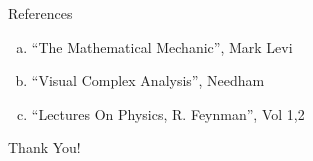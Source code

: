\documentclass[9pt]{beamer}
\begin{document}
\begin{frame}{References}
  \begin{enumerate}[a.]
  \item ``The Mathematical Mechanic'', Mark Levi
  \item ``Visual Complex Analysis'', Needham
  \item ``Lectures On Physics, R. Feynman'', Vol 1,2 
  \end{enumerate}
\end{frame}
\begin{frame}
  \begin{center}
    \Huge Thank You!
  \end{center}
  
\end{frame}
\end{document}
